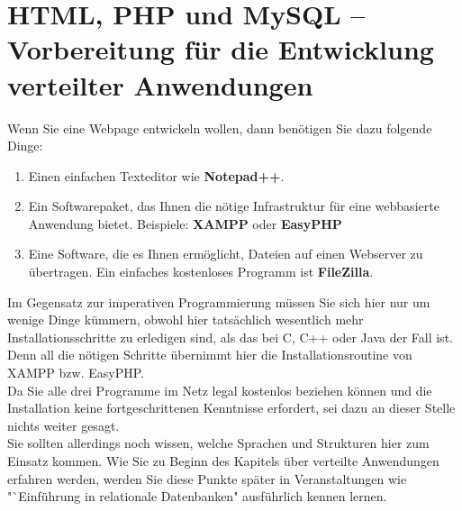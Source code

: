 \section{HTML, PHP und MySQL – Vorbereitung für die Entwicklung verteilter Anwendungen}

Wenn Sie eine Webpage entwickeln wollen, dann benötigen Sie dazu folgende Dinge:

\begin{enumerate}
	\item Einen einfachen Texteditor wie \textbf{Notepad++}.
	\item Ein Softwarepaket, das Ihnen die nötige Infrastruktur für eine webbasierte Anwendung bietet. Beispiele: \textbf{XAMPP} oder \textbf{EasyPHP}
	\item Eine Software, die es Ihnen ermöglicht, Dateien auf einen Webserver zu übertragen. Ein einfaches kostenloses Programm ist \textbf{FileZilla}.
\end{enumerate}

Im Gegensatz zur imperativen Programmierung müssen Sie sich hier nur um wenige Dinge kümmern, obwohl hier tatsächlich wesentlich mehr Installationsschritte zu erledigen sind, als das bei C, C++ oder Java der Fall ist. Denn all die nötigen Schritte übernimmt hier die Installationsroutine von XAMPP bzw. EasyPHP.\\

Da Sie alle drei Programme im Netz legal kostenlos beziehen können und die Installation keine fortgeschrittenen Kenntnisse erfordert, sei dazu an dieser Stelle nichts weiter gesagt.\\

Sie sollten allerdings noch wissen, welche Sprachen und Strukturen hier zum Einsatz kommen. Wie Sie zu Beginn des Kapitels über verteilte Anwendungen erfahren werden, werden Sie diese Punkte später in Veranstaltungen wie "`Einführung in relationale Datenbanken" ausführlich kennen lernen.

